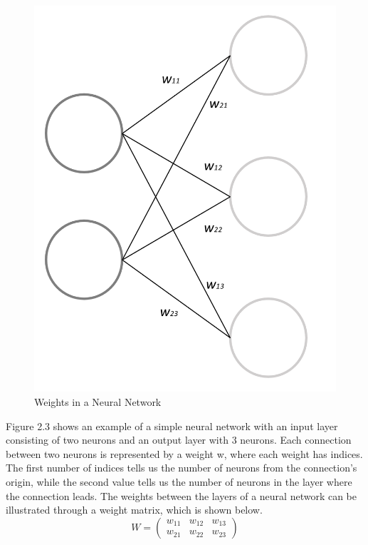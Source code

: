 \indent\newline 
\begin{figure}[H]
\centering
\includegraphics [scale=0.40,angle=360]{figures/weights.png}
\caption{Weights in a Neural Network}
\label{fig:weights}
\end{figure}

\indent\newline 
Figure 2.3 shows an example of a simple neural network with an input layer consisting of two neurons and an output layer with 3 neurons. Each connection between two neurons is represented by a weight w, where each weight has indices. The first number of indices tells us the number of neurons from the connection's origin, while the second value tells us the number of neurons in the layer where the connection leads. The weights between the layers of a neural network can be illustrated through a weight matrix, which is shown below. 
\indent\newline 
\begin{equation}
W = \begin{pmatrix}
w_{11} & w_{12} & w_{13}\\
w_{21} & w_{22} & w_{23}
\end{pmatrix}
\end{equation}

